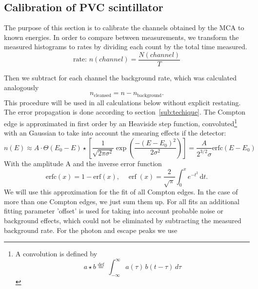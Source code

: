 \subsection{Calibration of PVC scintillator}
\label{sub:calibration}
The purpose of this section is to calibrate the channels obtained by the MCA to
known energies. In order to compare between measurements, we transform the measured 
histograms to rates by dividing each count by the total time measured. 
\begin{equation}
    \text{rate: } n(channel)  = 	\frac{N(channel)}{T}
    \label{eq:rate}
\end{equation}

Then we subtract for each channel the background rate, which
was calculated analogously 
\begin{equation}
    n_\mathrm{cleansed} = n - n_\mathrm{background}.
    \label{eq:rate2}
\end{equation}
This procedure will be used in all calculations below without explicit restating. 
The error propagation is done according to section~\ref{sub:techique}.
The Compton edge is approximated in first order by an Heaviside step function,
convoluted\footnote{ 
    A convolution is defined by
\begin{equation}
    a \star b   \stackrel{\mathrm{def}}{=}\ \int_{-\infty}^\infty a(\tau)\, b(t - \tau)\, d\tau 	
    \label{eq:conv}
\end{equation}

} with an Gaussian to take into account the smearing
effects if the detector:
\begin{equation}
    n(E)  \approx A\cdot \Theta(E_0 - E) \star  	
    \left[  \frac{1}{\sqrt{2\pi\sigma^2}} \exp \left( 
        \frac{-(E-E_0)^2}{2\sigma^2}\right)
        \right]  =\frac{A}{2^{3/2}\sigma} 
    \mathrm{erfc}(E - E_0) 
    \label{eq:errorfunc}
\end{equation}
With the amplitude A and the inverse error function
\begin{equation}
    \mathrm{erfc}(x) = 1 - \mathrm{erf}(x) , \quad
    \operatorname{erf}(x) = 
    \frac{2}{\sqrt\pi}\int_0^x e^{-t^2}\,\mathrm dt. 
    \label{eq:erfc}
\end{equation}
We will use this approximation for the fit of all Compton 
edges. In the case of more than one Compton edges, we just
sum them up. For all fits an additional fitting parameter 'offset'
is used for taking into account probable noise or background
effects, which could not be eliminated by subtracting the 
measured background rate. For the photon and escape peaks we use 
